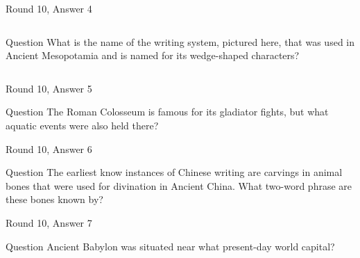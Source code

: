 \documentclass[11pt]{beamer}
\begin{document}
\begin{frame}[t]{Round 10, Answer 4}
\begin{columns}[T,totalwidth=\linewidth]
\begin{column}{0.32\linewidth}
\begin{block}{Question}
What is the name of the writing system, pictured here, that was used in Ancient Mesopotamia and is named for its wedge-shaped characters?
\end{block}
\end{column}
\begin{column}{0.65\linewidth}
\begin{center}
\texttt{[image: \{Images/cuneiform]}.jpg}
\end{center}
\end{column}
\end{columns}
\end{frame}
\begin{frame}[t]{Round 10, Answer 5}
\begin{block}{Question}
The Roman Colosseum is famous for its gladiator fights, but what aquatic events were also held there?
\end{block}
\end{frame}
\begin{frame}[t]{Round 10, Answer 6}
\begin{block}{Question}
The earliest know instances of Chinese writing are carvings in animal bones that were used for divination in Ancient China. What two-word phrase are these bones known by?
\end{block}
\end{frame}
\begin{frame}[t]{Round 10, Answer 7}
\begin{block}{Question}
Ancient Babylon was situated near what present-day world capital?
\end{block}
\end{frame}
\end{document}
